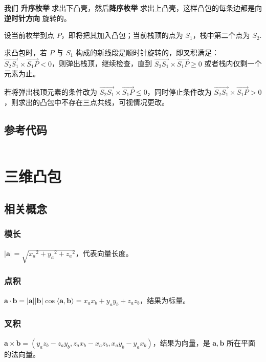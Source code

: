 \documentclass[a4paper, UTF8]{ctexart}
\begin{document}
我们 \textbf{升序枚举} 求出下凸壳，然后\textbf{降序枚举}
求出上凸壳，这样凸包的每条边都是向\textbf{逆时针方向} 旋转的。

设当前枚举到点 $P$，即将把其加入凸包；当前栈顶的点为
$S_1$，栈中第二个点为 $S_2$.

求凸包时，若 $P$ 与 $S_1$
构成的新线段是顺时针旋转的，即叉积满足：$\overrightarrow{S_2S_1}\times \overrightarrow{S_1P}<0$，则弹出栈顶，继续检查，直到
$\overrightarrow{S_2S_1}\times \overrightarrow{S_1P}\ge 0$
或者栈内仅剩一个元素为止。

若将弹出栈顶元素的条件改为
$\overrightarrow{S_2S_1}\times \overrightarrow{S_1P}\leq 0$，同时停止条件改为
$\overrightarrow{S_2S_1}\times \overrightarrow{S_1P}> 0$，则求出的凸包中不存在三点共线，可视情况更改。

\subsection{参考代码}

\inputminted[numbers=left, tabsize=4, frame=lines]{c++}{cpp/convex-hull-2d.cpp}

\section{三维凸包}

\subsection{相关概念}

\subsubsection{模长}
$|\boldsymbol a|=\sqrt{{x_a}^2 + {y_a}^2 + {z_a}^2}$，代表向量长度。

\subsubsection{点积}
$\boldsymbol a\cdot \boldsymbol b = |\boldsymbol a| |\boldsymbol b|\cos \langle \boldsymbol a,\boldsymbol b\rangle = x_ax_b+y_ay_b+z_az_b$，结果为标量。

\subsubsection{叉积}
$\boldsymbol a\times \boldsymbol b = (y_az_b-z_ay_b, z_ax_b-x_az_b, x_ay_b-y_ax_b)$，结果为向量，是 $\boldsymbol a, \boldsymbol b$ 所在平面的法向量。
\end{document}
